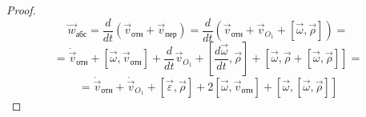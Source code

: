   \begin{proof}
  $$ \vec{w}_{\text{абс}} = \frac{d}{dt}(\vec{v}_{\text{отн}} + \vec{v}_{\text{пер}}) = \frac{d}{dt} (\vec{v}_{\text{отн}} + \vec{v}_{O_1} + [\vec{\omega}, \vec{\rho}]) = $$ 
  $$ = \dot{\vec{v}}_{\text{отн}} + [\vec{\omega}, \vec{v}_{\text{отн}}] + \frac{d}{dt}\vec{v}_{O_1} + \left[\frac{d\vec{\omega}}{dt}, \vec{\rho}\right] + [\vec{\omega}, \vec{\rho} + [\vec{\omega}, \vec{\rho}]] = $$ 
  $$ = \dot{\vec{v}}_{\text{отн}} + \dot{\vec{v}}_{O_1} + [\vec{\varepsilon}, \vec{\rho}] + 2[\vec{\omega}, \vec{v}_{\text{отн}}] + [\vec{\omega}, [\vec{\omega}, \vec{\rho}]] $$
  \end{proof}